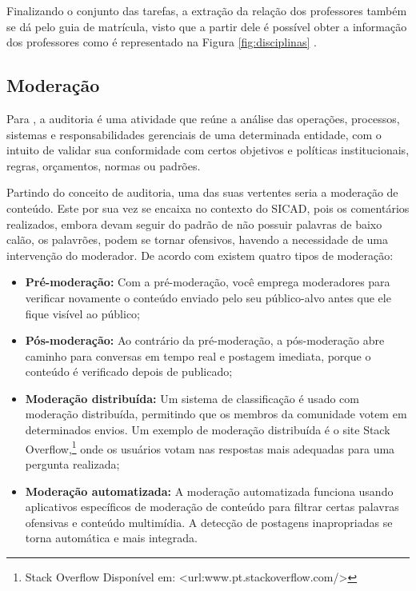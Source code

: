 \documentclass[12pt, a4paper]{report}
\begin{document}
Finalizando o conjunto das tarefas, a extração da relação dos professores também se dá pelo guia de matrícula, visto que a partir dele é possível obter a informação dos professores como é representado na Figura \ref{fig:disciplinas} . 

\subsection{Moderação}
\label{subsec:moderacao}
Para \citep{netosolanca2007}, a auditoria é uma atividade que reúne a análise das operações, processos, sistemas e responsabilidades gerenciais de uma determinada entidade, com o intuito de validar sua conformidade com certos objetivos e políticas institucionais, regras, orçamentos, normas ou padrões.

Partindo do conceito de auditoria, uma das suas vertentes seria a moderação de conteúdo. Este por sua vez se encaixa no contexto do SICAD, pois os comentários realizados, embora devam seguir do padrão de não possuir palavras de baixo calão, os palavrões, podem se tornar ofensivos, havendo a necessidade de uma intervenção do moderador.
De acordo com \cite{SMITH2019} existem quatro tipos de moderação:
\begin{itemize}
\item \textbf {Pré-moderação: }Com a pré-moderação, você emprega moderadores para verificar novamente o conteúdo enviado pelo seu público-alvo antes que ele fique visível ao público; 
\item \textbf {Pós-moderação: }Ao contrário da pré-moderação, a pós-moderação abre caminho para conversas em tempo real e postagem imediata, porque o conteúdo é verificado depois de publicado;
\item \textbf {Moderação distribuída: }Um sistema de classificação é usado com moderação distribuída, permitindo que os membros da comunidade votem em determinados envios. Um exemplo de moderação distribuída é o site Stack Overflow,\footnote{Stack Overflow Disponível em: <url:{www.pt.stackoverflow.com}/>} onde os usuários votam nas respostas mais adequadas para uma pergunta realizada;
\item \textbf {Moderação automatizada: } A moderação automatizada funciona usando aplicativos específicos de moderação de conteúdo para filtrar certas palavras ofensivas e conteúdo multimídia. A detecção de postagens inapropriadas se torna automática e mais integrada. 
\end{itemize}
\end{document}
